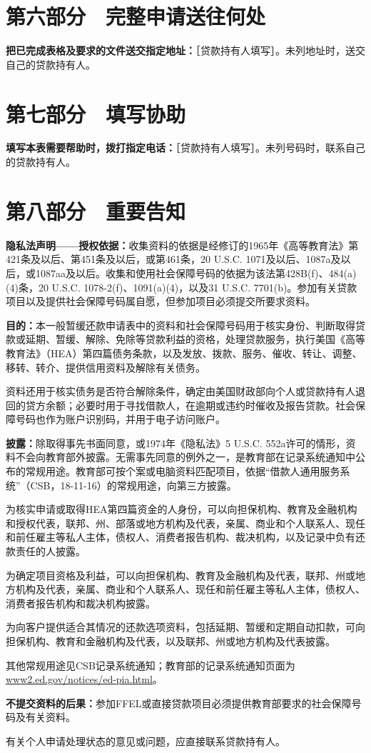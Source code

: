 \documentclass[UTF8,fontset=none,11pt,a4paper]{ctexart}
\begin{document}
\section*{第六部分　完整申请送往何处}
\textbf{把已完成表格及要求的文件送交指定地址：}［贷款持有人填写］。未列地址时，送交自己的贷\allowbreak\mbox{款持有人。}


\section*{第七部分　填写协助}
\textbf{填写本表需要帮助时，拨打指定电话：}［贷款持有人填写］。未列号码时，联系自己的贷\allowbreak\mbox{款持有人。}


\section*{第八部分　重要告知}
\textbf{隐私法声明——授权依据：}收集资料的依据是经修订的1965年《高等教育法》第421条及以后、第451条及以后，或第461条，20 U.S.C. 1071及以后、1087a及以后，或1087aa及以后。收集和使用社会保障号码的依据为该法第428B(f)、484(a)(4)条，20 U.S.C. 1078-2(f)、1091(a)(4)，以及31 U.S.C. 7701(b)。参加有关贷款项目以及提供社会保障号码属自愿，但参加项目必须提交所要\allowbreak\mbox{求资料。}


\textbf{目的：}本一般暂缓还款申请表中的资料和社会保障号码用于核实身份、判断取得贷款或延期、暂缓、解除、免除等贷款利益的资格，处理贷款服务，执行美国《高等教育法》（HEA）第四篇债务条款，以及发放、拨款、服务、催收、转让、调整、移转、转介、提供信用资料及解除有\allowbreak\mbox{关债务。}


资料还用于核实债务是否符合解除条件，确定由美国财政部向个人或贷款持有人退回的贷方余额；必要时用于寻找借款人，在逾期或违约时催收及报告贷款。社会保障号码也作为账户识别码，并用于电子访\allowbreak\mbox{问账户。}


\textbf{披露：}除取得事先书面同意，或1974年《隐私法》5 U.S.C. 552a许可的情形，资料不会向教育部外披露。无需事先同意的例外之一，是教育部在记录系统通知中公布的常规用途。教育部可按个案或电脑资料匹配项目，依据“借款人通用服务系统”（CSB，18-11-16）的常规用途，向第三\allowbreak\mbox{方披露。}


为核实申请或取得HEA第四篇资金的人身份，可以向担保机构、教育及金融机构和授权代表，联邦、州、部落或地方机构及代表，亲属、商业和个人联系人、现任和前任雇主等私人主体，债权人、消费者报告机构、裁决机构，以及记录中负有还款责任\allowbreak\mbox{的人披露。}


为确定项目资格及利益，可以向担保机构、教育及金融机构及代表，联邦、州或地方机构及代表，亲属、商业和个人联系人、现任和前任雇主等私人主体，债权人、消费者报告机构和裁决\allowbreak\mbox{机构披露。}


为向客户提供适合其情况的还款选项资料，包括延期、暂缓和定期自动扣款，可向担保机构、教育和金融机构及代表，以及联邦、州或地方机构及\allowbreak\mbox{代表披露。}


其他常规用途见CSB记录系统通知；教育部的记录系统通知页面为\url{www2.ed.gov/notices/ed-pia.html}。


\textbf{不提交资料的后果：}参加FFEL或直接贷款项目必须提供教育部要求的社会保障号码及有\allowbreak\mbox{关资料。}


有关个人申请处理状态的意见或问题，应直接联系贷\allowbreak\mbox{款持有人。}
\end{document}
